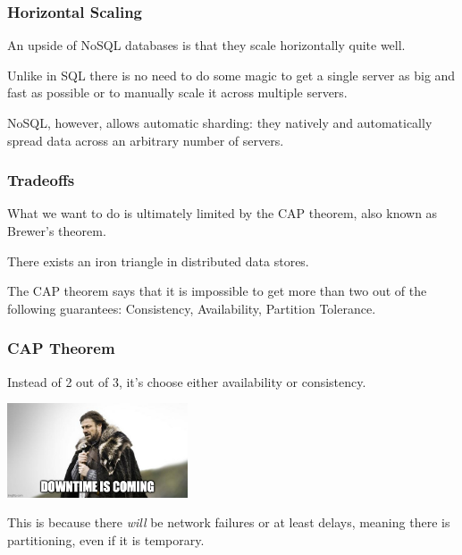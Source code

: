 \begin{frame}
\frametitle{Horizontal Scaling}

An upside of NoSQL databases is that they scale horizontally quite well. 

Unlike in SQL there is no need to do some magic to get a single server as big and fast as possible or to manually scale it across multiple servers. 

NoSQL, however, allows \alert{automatic sharding}: they natively and automatically spread data across an arbitrary number of servers.  


\end{frame}



\begin{frame}
\frametitle{Tradeoffs}

What we want to do is ultimately limited by the CAP theorem, also known as Brewer's theorem. 

There exists an iron triangle in distributed data stores.

 The CAP theorem says that it is impossible to get more than two out of the following guarantees: Consistency, Availability, Partition Tolerance.

\end{frame}



\begin{frame}
\frametitle{CAP Theorem}

Instead of 2 out of 3, it's choose either availability or consistency.

\begin{center}
	\includegraphics[width=0.4\textwidth]{images/downtime.jpg}
\end{center}

This is because there \textit{will} be network failures or at least delays, meaning there is partitioning, even if it is temporary. 

\end{frame}



